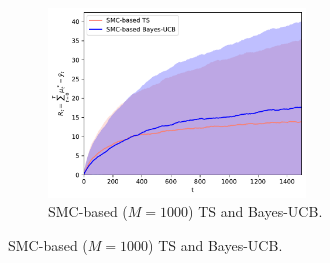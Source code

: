 \begin{figure}[!h]
	\centering
	\begin{subfigure}[b]{\textwidth}
		\centering
		\includegraphics[width=0.75\textwidth]{./fods_figs/static/logistic/A2/theta-0.5_-0.5_0.5_0.5_M1000_cumulative_regret}
		\caption{SMC-based ($M=1000$) TS and Bayes-UCB.}
	\end{subfigure}
	

\end{figure}
